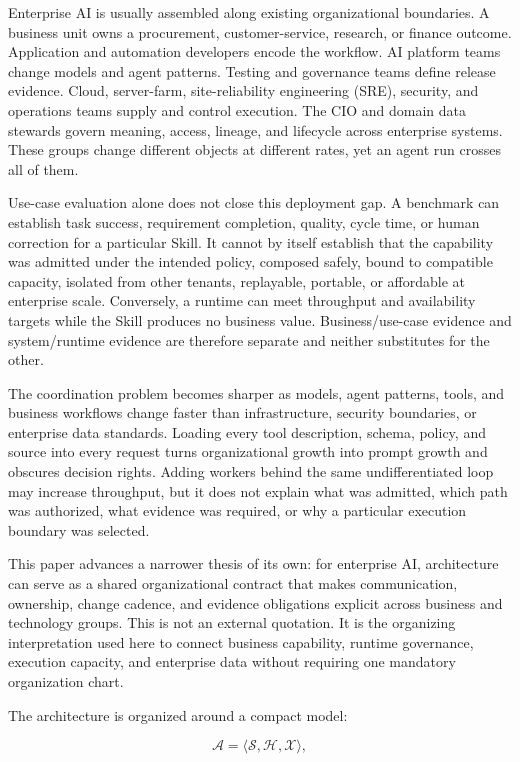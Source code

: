 Enterprise AI is usually assembled along existing organizational boundaries. A business unit owns a procurement, customer-service, research, or finance outcome. Application and automation developers encode the workflow. AI platform teams change models and agent patterns. Testing and governance teams define release evidence. Cloud, server-farm, site-reliability engineering (SRE), security, and operations teams supply and control execution. The CIO and domain data stewards govern meaning, access, lineage, and lifecycle across enterprise systems. These groups change different objects at different rates, yet an agent run crosses all of them.

Use-case evaluation alone does not close this deployment gap. A benchmark can establish task success, requirement completion, quality, cycle time, or human correction for a particular Skill. It cannot by itself establish that the capability was admitted under the intended policy, composed safely, bound to compatible capacity, isolated from other tenants, replayable, portable, or affordable at enterprise scale. Conversely, a runtime can meet throughput and availability targets while the Skill produces no business value. Business/use-case evidence and system/runtime evidence are therefore separate and neither substitutes for the other.

The coordination problem becomes sharper as models, agent patterns, tools, and business workflows change faster than infrastructure, security boundaries, or enterprise data standards. Loading every tool description, schema, policy, and source into every request turns organizational growth into prompt growth and obscures decision rights. Adding workers behind the same undifferentiated loop may increase throughput, but it does not explain what was admitted, which path was authorized, what evidence was required, or why a particular execution boundary was selected.

This paper advances a narrower thesis of its own: for enterprise AI, architecture can serve as a shared organizational contract that makes communication, ownership, change cadence, and evidence obligations explicit across business and technology groups. This is not an external quotation. It is the organizing interpretation used here to connect business capability, runtime governance, execution capacity, and enterprise data without requiring one mandatory organization chart.

The architecture is organized around a compact model:

\begin{equation}
\mathcal{A}=\langle\mathcal{S},\mathcal{H},\mathcal{X}\rangle,
\end{equation}

